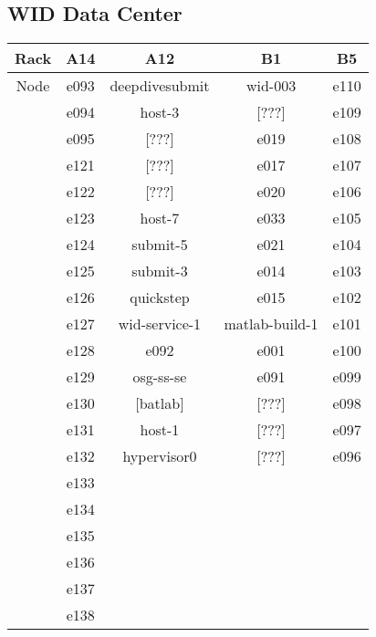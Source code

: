\documentclass[10pt,letterpaper]{article}
\begin{document}
    \subsection{WID Data Center}
        \begin{center}
        \begin{tabular}{ |c|c|c|c|c|}
        \hline
        Rack & A14 & A12 & B1 & B5 \\
        \hline
        \multirow{1}{3em}{Node}

        & e093  & deepdivesubmit & wid-003        & e110 \\
        & e094  & host-3         & [???]          & e109 \\
        & e095  & [???]          & e019           & e108 \\
        & e121  & [???]          & e017           & e107 \\
        & e122  & [???]          & e020           & e106 \\
        & e123  & host-7         & e033           & e105 \\
        & e124  & submit-5       & e021           & e104 \\
        & e125  & submit-3       & e014           & e103 \\
        & e126  & quickstep      & e015           & e102 \\
        & e127  & wid-service-1  & matlab-build-1 & e101 \\
        & e128  & e092           & e001           & e100 \\
        & e129  & osg-ss-se      & e091           & e099 \\
        & e130  & [batlab]       & [???]          & e098 \\
        & e131  & host-1         & [???]          & e097 \\
        & e132  & hypervisor0    & [???]          & e096 \\
        & e133  &                &                &      \\
        & e134  &                &                &      \\
        & e135  &                &                &      \\
        & e136  &                &                &      \\
        & e137  &                &                &      \\
        & e138  &                &                &      \\

\end{tabular}
\end{center}
\end{document}
